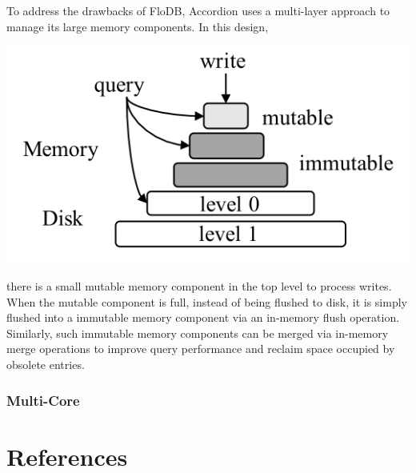 \documentclass[11pt]{article}
\begin{document}
To address the drawbacks of FloDB, Accordion uses a multi-layer approach to manage its large memory
components. In this design,
\begin{center}
\includegraphics[width=.8\textwidth]{../../images/db/11.png}
\end{center}
there is a small mutable memory component in the top level to process writes. When the mutable
component is full, instead of being flushed to disk, it is simply flushed into a immutable memory
component via an in-memory flush operation. Similarly, such immutable memory components can be merged
via in-memory merge operations to improve query performance and reclaim space occupied by obsolete entries.
\subsubsection{Multi-Core}
\label{sec:org84efd77}
\section{References}
\label{sec:org3660303}
\label{bibliographystyle link}


\label{bibliography link}

\end{document}
